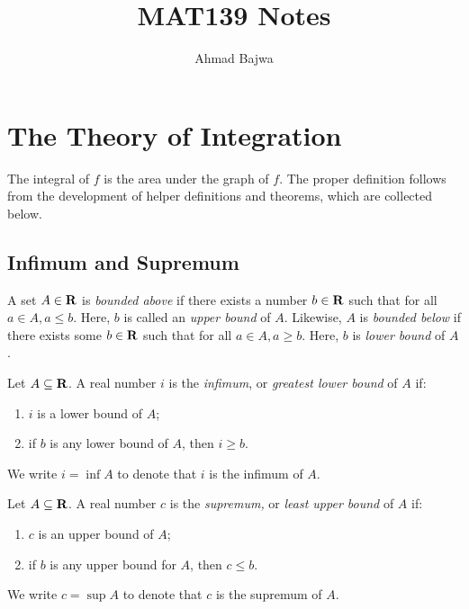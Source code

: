 \documentclass{article}
\title{MAT139 Notes}
\author{Ahmad Bajwa}
\begin{document}
\maketitle
\tableofcontents
\pagebreak

\section{The Theory of Integration}
    The integral of \(f\) is the area under the graph of \(f\). The proper definition follows from the development of helper definitions and theorems, which are collected below.

    \subsection{Infimum and Supremum}
    
    \begin{defi}[Bounds]
      A set \(A \in \mathbf{R}\) is \emph{bounded above} if there exists a number \(b \in \mathbf{R}\) such that for all \(a \in A, a \leq b\). Here, \(b\) is called an \emph{upper bound} of \(A\). Likewise, \(A\) is \emph{bounded below} if there exists some \(b \in \mathbf{R}\) such that for all \(a \in A, a \geq b\). Here, \(b\) is \emph{lower bound} of \(A\).
      \end{defi}

      \vspace*{5pt}

      \begin{defi}[Infimum]
        Let \(A \subseteq \mathbf{R}\). A real number \(i\) is the \emph{infimum}, or \emph{greatest lower bound} of \(A\) if:
        \begin{enumerate}
          \item \(i\) is a lower bound of \(A\);
          \item if \(b\) is any lower bound of \(A\), then \(i \geq b\).
        \end{enumerate}

        We write \(i = \inf A\) to denote that \(i\) is the infimum of \(A\).
      \end{defi}
      
      \vspace*{5pt}

      \begin{defi}[Supremum]
        Let \(A \subseteq \mathbf{R}\). A real number \(c\) is the \emph{supremum,} or \emph{least upper bound} of \(A\) if:
        \begin{enumerate}
          \item \(c\) is an upper bound of \(A\);
          \item if \(b\) is any upper bound for \(A\), then \(c \leq b\).
        \end{enumerate}

        We write \(c = \sup A\) to denote that \(c\) is the supremum of \(A\).
      \end{defi}
\end{document}
